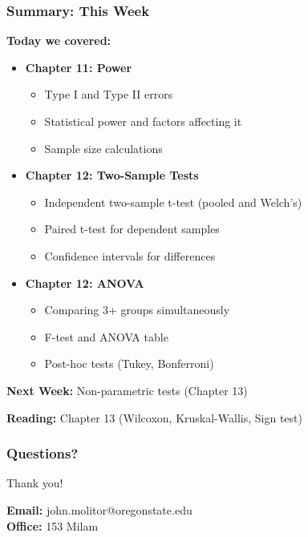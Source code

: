 \documentclass{beamer}
\begin{document}
\begin{frame}
\frametitle{Summary: This Week}
\textbf{Today we covered:}
\begin{itemize}
\item \textbf{Chapter 11: Power}
  \begin{itemize}
  \item Type I and Type II errors
  \item Statistical power and factors affecting it
  \item Sample size calculations
  \end{itemize}
\item \textbf{Chapter 12: Two-Sample Tests}
  \begin{itemize}
  \item Independent two-sample t-test (pooled and Welch's)
  \item Paired t-test for dependent samples
  \item Confidence intervals for differences
  \end{itemize}
\item \textbf{Chapter 12: ANOVA}
  \begin{itemize}
  \item Comparing 3+ groups simultaneously
  \item F-test and ANOVA table
  \item Post-hoc tests (Tukey, Bonferroni)
  \end{itemize}
\end{itemize}

\vspace{0.5cm}
\textbf{Next Week:} Non-parametric tests (Chapter 13)

\vspace{0.3cm}
\textbf{Reading:} Chapter 13 (Wilcoxon, Kruskal-Wallis, Sign test)
\end{frame}

\begin{frame}
\frametitle{Questions?}
\begin{center}
\Large{Thank you!}

\vspace{1cm}

\textbf{Email:} john.molitor@oregonstate.edu\\
\textbf{Office:} 153 Milam
\end{center}
\end{frame}
\end{document}
